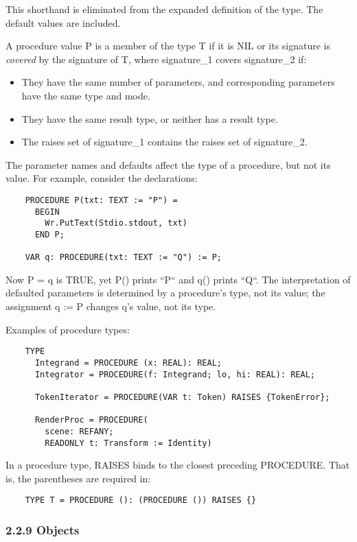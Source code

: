 \documentclass[10pt]{article}
\begin{document}
  This shorthand is eliminated from the expanded definition of the type. The default values are included. 


 A procedure value P is a member of the type T if it is NIL or its signature is \emph{covered}
 by the signature of T, where signature\_1 covers signature\_2 if: 
\begin{itemize}
\item  They have the same number of parameters, and corresponding parameters have the same type and mode. 
\item  They have the same result type, or neither has a result type. 
\item  The raises set of signature\_1 contains the raises set of signature\_2. 
\end{itemize}



  The parameter names and defaults affect the type of a procedure, but not its value. For example, consider the declarations: 
\begin{verbatim}
    PROCEDURE P(txt: TEXT := "P") = 
      BEGIN
        Wr.PutText(Stdio.stdout, txt)
      END P;

    VAR q: PROCEDURE(txt: TEXT := "Q") := P;
\end{verbatim}
 Now P = q is TRUE, yet P() prints ``P`` and q() prints ``Q``. The interpretation of defaulted parameters is determined by a procedure's type, not its value; the assignment q := P changes q's value, not its type. 


  Examples of procedure types: 
\begin{verbatim}
    TYPE
      Integrand = PROCEDURE (x: REAL): REAL;
      Integrator = PROCEDURE(f: Integrand; lo, hi: REAL): REAL;

      TokenIterator = PROCEDURE(VAR t: Token) RAISES {TokenError};

      RenderProc = PROCEDURE(
        scene: REFANY;
        READONLY t: Transform := Identity)
\end{verbatim}



 In a procedure type, RAISES binds to the closest preceding PROCEDURE. That is, the parentheses are required in: 
\begin{verbatim}
    TYPE T = PROCEDURE (): (PROCEDURE ()) RAISES {}
\end{verbatim}



 
\subsubsection*{2.2.9 Objects}
\end{document}
